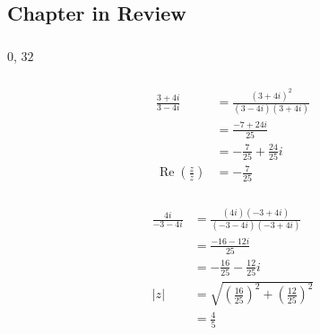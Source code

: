 \documentclass{article}
\renewcommand{\Re}{\operatorname{Re}}
\begin{document}
\subsection{Chapter in Review}

\subsubsection{}

$0$, $32$

\setcounter{subsubsection}{2}
\subsubsection{}

\begin{align*}
  \frac{3 + 4 i}{3 - 4 i}                   & = \frac{(3 + 4 i)^2}{(3 - 4 i) (3 + 4 i)} \\
                                            & = \frac{-7 + 24 i}{25}                    \\
                                            & = -\frac{7}{25} + \frac{24}{25} i         \\
  \Re \left( \frac{z}{\overline{z}} \right) & = -\frac{7}{25}
\end{align*}

\setcounter{subsubsection}{4}
\subsubsection{}

\begin{align*}
  \frac{4 i}{-3 - 4 i} & = \frac{(4 i) (-3 + 4 i)}{(-3 - 4 i) (-3 + 4 i)}                         \\
                       & = \frac{-16 - 12 i}{25}                                                  \\
                       & = -\frac{16}{25} - \frac{12}{25} i                                       \\
  |z|                  & = \sqrt{\left( \frac{16}{25} \right)^2 + \left( \frac{12}{25} \right)^2} \\
                       & = \frac{4}{5}
\end{align*}

\setcounter{subsubsection}{6}
\subsubsection{}
\end{document}
